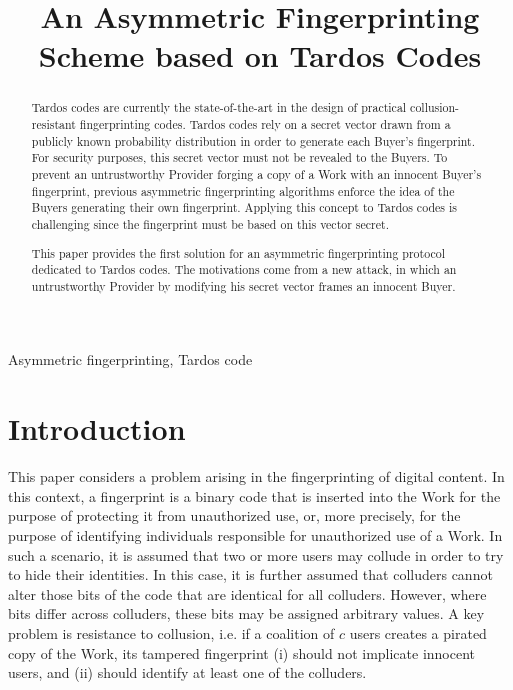 \documentclass{article}
\title{An Asymmetric Fingerprinting Scheme based on Tardos Codes}
\begin{document}
\maketitle
\begin{abstract}

Tardos codes are currently the state-of-the-art in the design of
practical collusion-resistant fingerprinting codes.
Tardos codes rely on a secret vector drawn from a publicly known probability
distribution in order to generate each
Buyer's fingerprint.  For security purposes, this secret vector must not be revealed to
the Buyers.  To prevent an untrustworthy Provider forging a copy of a
Work with an innocent Buyer's fingerprint, previous asymmetric
fingerprinting algorithms enforce the idea of the Buyers generating their own
fingerprint. Applying this concept to Tardos codes is challenging since the
fingerprint must be based on this vector secret.

This paper provides the first solution for an
asymmetric fingerprinting protocol dedicated to Tardos codes.
The motivations come from a new attack, in which an
untrustworthy Provider by modifying his secret vector frames an innocent Buyer.

\end{abstract}
\begin{keywords}
Asymmetric fingerprinting, Tardos code
\end{keywords}
\section{Introduction}
This paper considers a problem arising in the fingerprinting of
digital content.  In this context, a fingerprint is a binary code that
is inserted into the Work for the purpose of protecting it from
unauthorized use, or, more precisely, for the purpose of identifying
individuals responsible for unauthorized use of a Work.
In such a scenario, it is assumed that two or more users
may collude in order to try to hide their identities.  In this case,
it is further assumed that colluders cannot alter those bits of the
code that are identical for all colluders.  However, where bits differ
across colluders, these bits may be assigned arbitrary values.  A key
problem is resistance to collusion, i.e. if a coalition of $c$ users
creates a pirated copy of the Work, its tampered fingerprint (i) should not
implicate innocent users, and (ii) should identify at least one of
the colluders.
\end{document}

